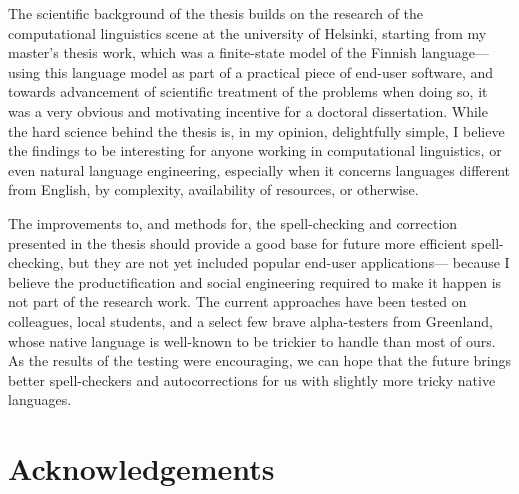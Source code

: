 \documentclass[officiallayout]{unihelcompling}
\begin{document}
The scientific background of the thesis builds on the research of the
computational linguistics scene at the university of Helsinki, starting from my
master's thesis work, which was a finite-state model of the Finnish
language---using this language model as part of a practical piece of end-user
software, and towards advancement of scientific treatment of the problems
when doing so, it was a very obvious and motivating incentive for a doctoral
dissertation. While the hard science behind the thesis is, in my opinion,
delightfully simple, I believe the findings to be interesting for anyone
working in computational linguistics, or even natural language engineering,
especially when it concerns languages different from English, by complexity,
availability of resources, or otherwise.

The improvements to, and methods for, the spell-checking and correction
presented in the thesis should provide a good base for future more efficient
spell-checking, but they are not yet included popular end-user applications---
because I believe the productification and social engineering required to make
it happen is not part of the research work. The current approaches have been
tested on colleagues, local students, and a select few brave alpha-testers from
Greenland, whose native language is well-known to be trickier to handle than
most of ours. As the results of the testing were encouraging, we can hope that
the future brings better spell-checkers and autocorrections for us with
slightly more tricky native languages.

\section*{Acknowledgements}
\label{sec:acknowledgements}
\end{document}
